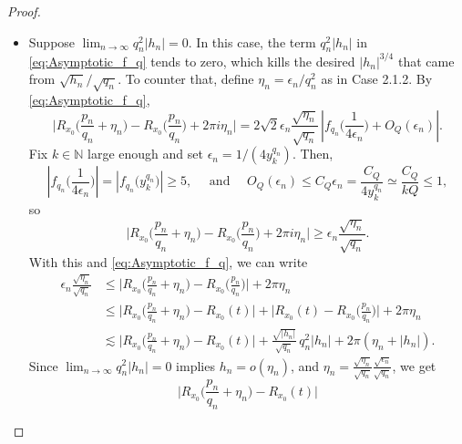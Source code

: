 \documentclass[11pt,reqno]{amsart}
\theoremstyle{definition}
\begin{document}
\begin{proof}
\begin{itemize}
\begin{itemize}
	
	\item[\textbf{Case 2.2.}] Suppose $\lim_{n \to \infty} q_n^2 |h_n| = 0$. 
	In this case, the term $q_n^2 |h_n|$ in \eqref{eq:Asymptotic_f_q} tends to zero, which kills the desired $|h_n|^{3/4}$ that came from $\sqrt{h_n}/\sqrt{q_n}$. 
	To counter that, define $\eta_n = \epsilon_n / q_n^2$ 
	as in Case 2.1.2. By \eqref{eq:Asymptotic_f_q}, 
	\begin{equation}
	\Big|  R_{x_0}\Big( \frac{p_n}{q_n} + \eta_n \Big) - R_{x_0}\Big( \frac{p_n}{q_n} \Big) + 2\pi i \eta_n  \Big|
	= 2\sqrt{2} \epsilon_n \frac{\sqrt{\eta_n}}{\sqrt{q_n}} \,
\left|  f_{q_n}\Big( \frac{1}{4\epsilon_n}  \Big)  + O_Q\left(\epsilon_n  \right)
\right|.
	\end{equation}
	Fix $k \in \mathbb N$ large enough and set $\epsilon_n = 1/(4y_k^{q_n})$. Then,
	\begin{equation}
	\left|  f_{q_n}\Big( \frac{1}{4\epsilon_n}  \Big)  \right| 
	= \left|  f_{q_n}\Big( y_k^{q_n} \Big)  \right| \geq 5, 
	\quad \text{ and } \quad
	O_Q(\epsilon_n) \leq C_Q \epsilon_n = \frac{C_Q}{4y_k^{q_n}} \simeq \frac{C_Q}{kQ} \leq 1,
	\end{equation}
	so
	\begin{equation}
	\Big|  R_{x_0}\Big( \frac{p_n}{q_n} + \eta_n \Big) - R_{x_0}\Big( \frac{p_n}{q_n} \Big) + 2\pi i \eta_n  \Big|
	\geq  \epsilon_n \frac{\sqrt{\eta_n}}{\sqrt{q_n}}. 
	\end{equation}
	With this and \eqref{eq:Asymptotic_f_q}, we can write
	\begin{equation}
	\begin{split}
	\epsilon_n \frac{\sqrt{\eta_n}}{\sqrt{q_n}} 
	&  \leq \Big|  R_{x_0}\Big( \frac{p_n}{q_n} + \eta_n \Big) - R_{x_0}\Big( \frac{p_n}{q_n} \Big) \Big| + 2\pi \eta_n  \\
	 &  \leq \Big|  R_{x_0}\Big( \frac{p_n}{q_n} + \eta_n \Big) -R_{x_0}(t) \Big| + \Big| R_{x_0}(t) -  R_{x_0}\Big( \frac{p_n}{q_n} \Big) \Big| + 2\pi \eta_n  \\ 
	 &  \lesssim \Big|  R_{x_0}\Big( \frac{p_n}{q_n} + \eta_n \Big) -R_{x_0}(t) \Big| + \frac{\sqrt{|h_n|}}{\sqrt{q_n}} \, q_n^2 |h_n| + 2\pi (\eta_n + |h_n|).
	 \end{split}
	\end{equation}
	Since $\lim_{n \to \infty} q_n^2 |h_n|=0$ implies $h_n = o(\eta_n)$, and $\eta_n =  \frac{\sqrt{\eta_n}}{\sqrt{q_n}} \frac{\sqrt{\epsilon_n}}{\sqrt{q_n}}$, 
	we get
	\begin{equation}
	\Big|  R_{x_0}\Big( \frac{p_n}{q_n} + \eta_n \Big) -R_{x_0}(t) \Big|

\end{equation}
\end{itemize}
\end{itemize}
\end{proof}
\end{document}
